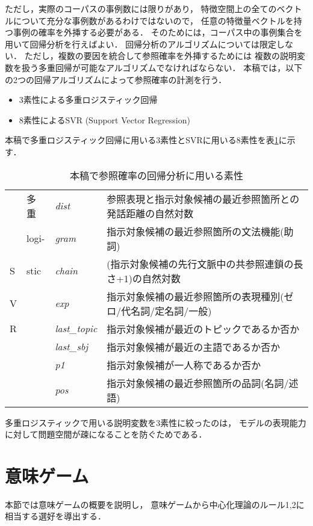 ただし，実際のコーパスの事例数には限りがあり，
特徴空間上の全てのベクトルについて充分な事例数があるわけではないので，
任意の特徴量ベクトルを持つ事例の確率を外挿する必要がある．
そのためには，コーパス中の事例集合を用いて回帰分析を行えばよい．
回帰分析のアルゴリズムについては限定しない．
ただし，複数の要因を統合して参照確率を外挿するためには
複数の説明変数を扱う多重回帰が可能なアルゴリズムでなければならない．
本稿では，以下の2つの回帰アルゴリズムによって参照確率の計測を行う．
\begin{itemize}
\item 3素性による多重ロジスティック回帰
\item 8素性によるSVR (Support Vector Regression)
\end{itemize}
本稿で多重ロジスティック回帰に用いる3素性とSVRに用いる8素性を表\ref{tab:features}に示す．
\begin{table}
\begin{center}
\begin{tabular}{|l|l|l|l|}
\hline
&多重&{\it dist}&参照表現と指示対象候補の最近参照箇所との発話距離の自然対数\\
&logi-&{\it gram}&指示対象候補の最近参照箇所の文法機能(助詞)\\
S&stic&{\it chain}&(指示対象候補の先行文脈中の共参照連鎖の長さ+1)の自然対数\\
\cline{2-4}
V&&{\it exp}&指示対象候補の最近参照箇所の表現種別(ゼロ/代名詞/定名詞/一般)\\
R&&{\it last\_{}topic}&指示対象候補が最近のトピックであるか否か\\
&&{\it last\_{}sbj}&指示対象候補が最近の主語であるか否か\\
&&{\it p1}&指示対象候補が一人称であるか否か\\
&&{\it pos}&指示対象候補の最近参照箇所の品詞(名詞/述語)\\
\hline
\end{tabular}
\end{center}
\caption{本稿で参照確率の回帰分析に用いる素性}
\label{tab:features}
\end{table}
多重ロジスティックで用いる説明変数を3素性に絞ったのは，
モデルの表現能力に対して問題空間が疎になることを防ぐためである．


\section{意味ゲーム}\label{meaning_game}

本節では意味ゲームの概要を説明し，
意味ゲームから中心化理論のルール1,2に相当する選好を導出する．

